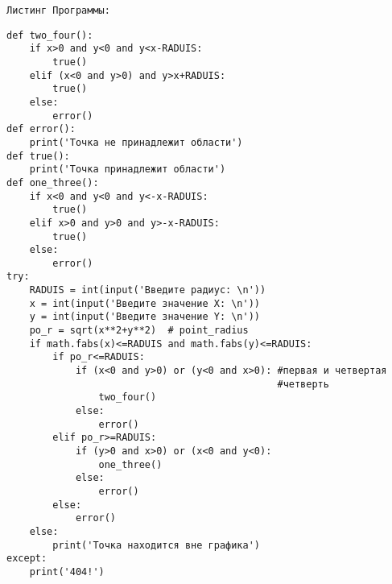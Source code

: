 \documentclass[a4paper]{article}
\begin{document}
\begin{lab2.2}
\begin{algoritm}
\begin{enumerate}
        \end{enumerate}
    \end{algoritm}
        \texttt{Листинг Программы:}
    \begin{verbatim}
def two_four():
    if x>0 and y<0 and y<x-RADUIS:
        true()
    elif (x<0 and y>0) and y>x+RADUIS:
        true()
    else:
        error()
def error():
    print('Точка не принадлежит области')
def true():
    print('Точка принадлежит области')
def one_three():
    if x<0 and y<0 and y<-x-RADUIS:
        true()
    elif x>0 and y>0 and y>-x-RADUIS:
        true()
    else:
        error()
try:
    RADUIS = int(input('Введите радиус: \n'))
    x = int(input('Введите значение X: \n'))
    y = int(input('Введите значение Y: \n'))
    po_r = sqrt(x**2+y**2)  # point_radius
    if math.fabs(x)<=RADUIS and math.fabs(y)<=RADUIS:
        if po_r<=RADUIS:
            if (x<0 and y>0) or (y<0 and x>0): #первая и четвертая 
                                               #четверть
                two_four()
            else:
                error()
        elif po_r>=RADUIS:
            if (y>0 and x>0) or (x<0 and y<0):
                one_three()
            else:
                error()
        else:
            error()
    else:
        print('Точка находится вне графика')
except:
    print('404!')
    \end{verbatim}
    \end{lab2.2}
\end{document}
